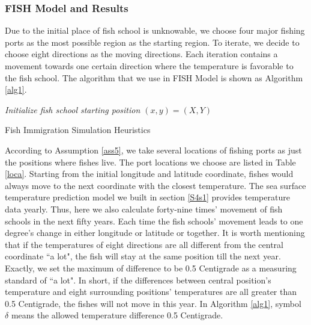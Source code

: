 \documentclass{mcmthesis}
\begin{document}
\subsubsection{FISH Model and Results}\label{S4s22}
	 Due to the initial place of fish school is unknowable, we choose four major fishing ports as the most possible region as the starting region. To iterate, we decide to choose eight directions as the moving directions. Each iteration contains a movement towards one certain direction where the temperature is favorable to the fish school. The algorithm that we use in FISH Model is shown as Algorithm \ref{alg1}.\par


\IncMargin{1em}
\begin{algorithm}[H]

\BlankLine
\BlankLine
\emph{Initialize fish school starting position $ (x, y) = (X, Y)$}\;
\SetAlgoLined\SetArgSty{}
\caption{Fish Immigration Simulation Heuristics}\label{alg1}
\end{algorithm}\DecMargin{1em}\par
    According to Assumption \ref{ass5}, we take several locations of fishing ports as just the positions where fishes live. The port locations we choose are listed in Table \ref{loca}. Starting from the initial longitude and latitude coordinate, fishes would always move to the next coordinate with the closest temperature. The sea surface temperature prediction model we built in section \ref{S4s1} provides temperature data yearly. Thus, here we also calculate forty-nine times' movement of fish schools in the next fifty years. Each time the fish schools' movement leads to one degree's change in either longitude or latitude or together. It is worth mentioning that if the temperatures of  eight directions are all different from the central coordinate ``a lot", the fish will stay at the same position till the next year. Exactly, we set the maximum of difference to be 0.5 Centigrade as a measuring standard of ``a lot". In short, if the differences between central position's temperature and eight surrounding positions' temperatures are all greater than 0.5 Centigrade, the fishes will not move in this year. In Algorithm \ref{alg1}, symbol $\delta$ means the allowed temperature difference 0.5 Centigrade. \par
\end{document}
